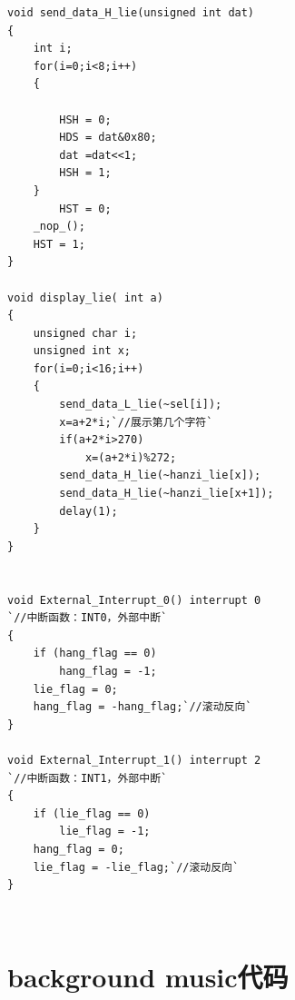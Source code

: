\documentclass[UTF8]{ctexart}
\begin{document}
\begin{lstlisting}
void send_data_H_lie(unsigned int dat)
{
    int i;
    for(i=0;i<8;i++)
    {
			
        HSH = 0;
        HDS = dat&0x80;
        dat =dat<<1;
        HSH = 1;
    }	
		HST = 0;
    _nop_();
    HST = 1;
}

void display_lie( int a)
{
    unsigned char i;
	unsigned int x;
    for(i=0;i<16;i++)
    {
        send_data_L_lie(~sel[i]);
	    x=a+2*i;`//展示第几个字符`
		if(a+2*i>270)
			x=(a+2*i)%272;
		send_data_H_lie(~hanzi_lie[x]);
		send_data_H_lie(~hanzi_lie[x+1]);
		delay(1);	
    }
}


void External_Interrupt_0() interrupt 0
`//中断函数：INT0，外部中断`
{
    if (hang_flag == 0)
	    hang_flag = -1;
    lie_flag = 0;
    hang_flag = -hang_flag;`//滚动反向`
}

void External_Interrupt_1() interrupt 2
`//中断函数：INT1，外部中断`
{
    if (lie_flag == 0)
	    lie_flag = -1;
    hang_flag = 0;
    lie_flag = -lie_flag;`//滚动反向`
}
\end{lstlisting}
  \section{background music代码}
\end{document}
